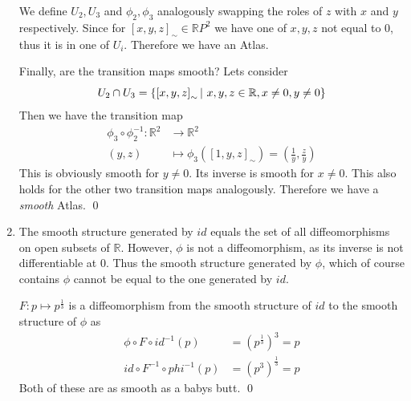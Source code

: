\documentclass[a4paper,11pt,notitlepage,fullpage]{article}
\begin{document}
\begin{enumerate}
We define $U_2, U_3$ and $\phi_2, \phi_3$ analogously swapping the roles of $z$ with $x$ and $y$ respectively. Since for $\left[x,y,z\right]_\sim \in \mathbb RP^2$ we have one of $x, y, z$ not equal to $0$, thus it is in one of $U_i$. Therefore we have an Atlas.

Finally, are the transition maps smooth? Lets consider 
\begin{equation*}
U_2 \cap U_3 = \left\{\left[x,y,z\right]_\sim \centering|~ x, y, z \in \mathbb R, x \neq 0, y \neq 0 \right\}
\end{equation*}
Then we have the transition map
\begin{align*}
\phi_3 \circ \phi_2^{-1} :  \mathbb R^2 &\to \mathbb R^2 \\
(y, z) &\mapsto \phi_3(\left[1,y,z\right]_\sim) = (\frac{1}{y}, \frac{z}{y})
\end{align*}
This is obviously smooth for $y \neq 0$. Its inverse is smooth for $x \neq 0$. This also holds for the other two transition maps analogously. Therefore we have a \emph{smooth} Atlas. \qed

\item The smooth structure generated by $id$ equals the set of all diffeomorphisms on open subsets of $\mathbb R$. However, $\phi$ is not a diffeomorphism, as its inverse is not differentiable at 0. Thus the smooth structure generated by $\phi$, which of course contains $\phi$ cannot be equal to the one generated by $id$.

$F: p \mapsto p^{\frac{1}{3}}$ is a diffeomorphism from the smooth structure of $id$ to the smooth structure of $\phi$ as
\begin{align*}
\phi \circ F \circ id^{-1} (p) &= (p^{\frac{1}{3}})^3 = p \\
id \circ F^{-1} \circ phi^{-1} (p) &= (p^3)^{\frac{1}{3}} = p
\end{align*}
Both of these are as smooth as a babys butt. \qed


\end{enumerate}
\end{document}
